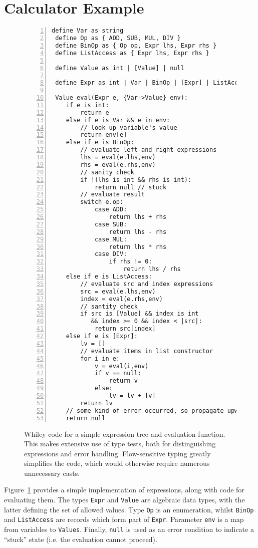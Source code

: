 \section{Calculator Example}
\begin{figure}[!p]
\begin{lstlisting}[numbers=left]
 define Var as string
 define Op as { ADD, SUB, MUL, DIV }
 define BinOp as { Op op, Expr lhs, Expr rhs } 
 define ListAccess as { Expr lhs, Expr rhs } 

 define Value as int | [Value] | null

 define Expr as int | Var | BinOp | [Expr] | ListAccess 

 Value eval(Expr e, {Var->Value} env):
    if e is int:
        return e
    else if e is Var && e in env:
        // look up variable's value
        return env[e]
    else if e is BinOp:
        // evaluate left and right expressions
        lhs = eval(e.lhs,env)
        rhs = eval(e.rhs,env)
        // sanity check
        if !(lhs is int && rhs is int):
            return null // stuck
        // evaluate result
        switch e.op:
            case ADD:
                return lhs + rhs
            case SUB:
                return lhs - rhs
            case MUL:
                return lhs * rhs
            case DIV:
                if rhs != 0:
                    return lhs / rhs
    else if e is ListAccess:
        // evaluate src and index expressions
        src = eval(e.lhs,env)
        index = eval(e.rhs,env)
        // santity check
        if src is [Value] && index is int
           && index >= 0 && index < |src|:
            return src[index]
    else if e is [Expr]:
        lv = []
        // evaluate items in list constructor
        for i in e:
            v = eval(i,env)
            if v == null:
                return v
            else:
                lv = lv + [v]
        return lv
    // some kind of error occurred, so propagate upwards
    return null
\end{lstlisting}
\caption{Whiley code for a simple expression tree and evaluation
  function.  This makes extensive use of type tests, both for
  distinguishing expressions and error handling.  Flow-sensitive
  typing greatly simplifies the code, which would otherwise require
  numerous unnecessary casts.}
\label{eg1}
\end{figure}

Figure~\ref{eg1} provides a simple implementation of expressions,
along with code for evaluating them.  The types \lstinline{Expr} and
\lstinline{Value} are algebraic data types, with the latter defining
the set of allowed values.  Type \lstinline{Op} is an enumeration,
whilst \lstinline{BinOp} and \lstinline{ListAccess} are records which
form part of \lstinline{Expr}.  Parameter \lstinline{env} is a map
from variables to \lstinline{Values}.  Finally, \lstinline{null} is
used as an error condition to indicate a ``stuck'' state (i.e. the
evaluation cannot proceed).


